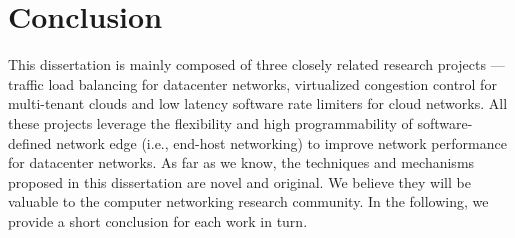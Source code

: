 
\section{Conclusion}

This dissertation is mainly composed of three closely related research projects --- traffic 
load balancing for datacenter networks, virtualized congestion control for multi-tenant 
clouds and low latency software rate limiters for cloud networks. All these projects 
leverage the flexibility and high programmability of software-defined network 
edge (i.e., end-host networking) to improve network performance for datacenter networks. 
As far as we know, the techniques and mechanisms proposed in this dissertation are novel and original. 
We believe they  will be valuable to the computer networking research community. 
In the following, we provide a short conclusion for each work in turn.


